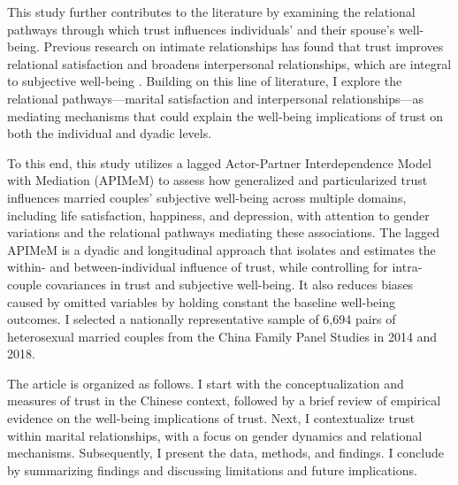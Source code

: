 This study further contributes to the literature by examining the relational pathways through which trust influences individuals' and their spouse's well-being. Previous research on intimate relationships has found that trust improves relational satisfaction and broadens interpersonal relationships, which are integral to subjective well-being \parencite{adilRoleTrustMarital2013,fitzpatrickAttachmentTrustSatisfaction2017,luLongitudinalEvidenceSocial2019,shekMaritalQualityPsychological1995,wongExaminationRelationshipTrust2002}. Building on this line of literature, I explore the relational pathways—marital satisfaction and interpersonal relationships—as mediating mechanisms that could explain the well-being implications of trust on both the individual and dyadic levels.

To this end, this study utilizes a lagged Actor-Partner Interdependence Model with Mediation (APIMeM) to assess how generalized and particularized trust influences married couples' subjective well-being across multiple domains, including life satisfaction, happiness, and depression, with attention to gender variations and the relational pathways mediating these associations. The lagged APIMeM is a dyadic and longitudinal approach that isolates and estimates the within- and between-individual influence of trust, while controlling for intra-couple covariances in trust and subjective well-being. It also reduces biases caused by omitted variables by holding constant the baseline well-being outcomes. I selected a nationally representative sample of 6,694 pairs of heterosexual married couples from the China Family Panel Studies in 2014 and 2018.

The article is organized as follows. I start with the conceptualization and measures of trust in the Chinese context, followed by a brief review of empirical evidence on the well-being implications of trust. Next, I contextualize trust within marital relationships, with a focus on gender dynamics and relational mechanisms. Subsequently, I present the data, methods, and findings. I conclude by summarizing findings and discussing limitations and future implications.
